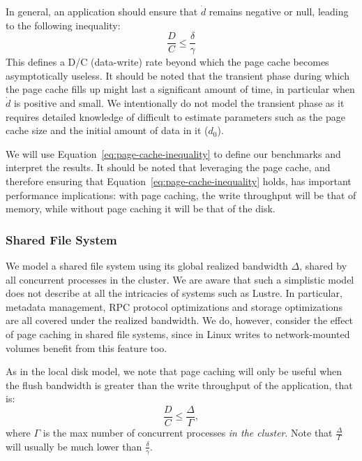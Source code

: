 \documentclass{IEEEtran}
\begin{document}
In general, an application should ensure that $\dot d$ remains negative 
or null, leading to the following inequality:
\begin{equation}
\frac{D}{C} \leq \frac{\delta}{\gamma} \label{eq:page-cache-inequality}
\end{equation}
This defines a D/C (data-write) rate beyond which the page cache becomes 
asymptotically useless. It should be noted that the transient phase 
during which the page cache fills up might last a significant amount of time, 
in particular when $\dot d$ is positive and small. We intentionally do not model the 
transient phase as it requires detailed knowledge of difficult to estimate parameters  
such as the page cache size and the initial amount 
of data in it ($d_0$).

 We will use Equation~\ref{eq:page-cache-inequality} to 
define our benchmarks and interpret the results. It 
should be noted that leveraging the page cache, and therefore ensuring 
that Equation~\ref{eq:page-cache-inequality} holds, has important 
performance implications: with page caching, the write throughput will 
be that of memory, while without page caching it will be that of the 
disk.


\subsubsection{Shared File System}

We model a shared file system using its global realized bandwidth 
$\Delta$, shared by all concurrent processes in the cluster. We are 
aware that such a simplistic model does not describe at all the 
intricacies of systems such as Lustre. In particular, metadata 
management, RPC protocol optimizations and storage optimizations are 
all covered under the realized bandwidth. We do, however, consider the 
effect of page caching in shared file systems, since in Linux 
writes to network-mounted volumes benefit from this feature too.

As in the local disk model, we note that page caching will only be 
useful when the flush bandwidth is greater than the write throughput of 
the application, that is:
\begin{equation}
\frac{D}{C} \leq \frac{\Delta}{\Gamma}, \label{eq:page-cache-sharedfs}
\end{equation}
where $\Gamma$ is the max number of concurrent processes \emph{in the cluster}. 
Note that $\frac{\Delta}{\Gamma}$ will usually be much lower than 
$\frac{\delta}{\gamma}$.     
\end{document}
